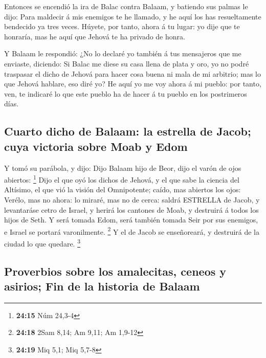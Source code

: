  Entonces se encendió la ira de Balac contra Balaam, y
batiendo sus palmas le dijo: Para maldecir á mis enemigos te he llamado,
y he aquí los has resueltamente bendecido ya tres veces. 
Húyete, por tanto, ahora á tu lugar: yo dije que te honraría, mas he
aquí que Jehová te ha privado de honra.

 Y Balaam le respondió: ¿No lo declaré yo también á tus
mensajeros que me enviaste, diciendo:  Si Balac me diese su
casa llena de plata y oro, yo no podré traspasar el dicho de Jehová para
hacer cosa buena ni mala de mi arbitrio; mas lo que Jehová hablare, eso
diré yo?  He aquí yo me voy ahora á mi pueblo: por tanto,
ven, te indicaré lo que este pueblo ha de hacer á tu pueblo en los
postrimeros días.

\hypertarget{cuarto-dicho-de-balaam-la-estrella-de-jacob-cuya-victoria-sobre-moab-y-edom}{%
\subsection{Cuarto dicho de Balaam: la estrella de Jacob; cuya victoria
sobre Moab y
Edom}\label{cuarto-dicho-de-balaam-la-estrella-de-jacob-cuya-victoria-sobre-moab-y-edom}}

 Y tomó su parábola, y dijo: Dijo Balaam hijo de Beor, dijo
el varón de ojos abiertos: \footnote{\textbf{24:15} Núm 24,3-4}
 Dijo el que oyó los dichos de Jehová, y el que sabe la
ciencia del Altísimo, el que vió la visión del Omnipotente; caído, mas
abiertos los ojos:  Verélo, mas no ahora: lo miraré, mas no
de cerca: saldrá ESTRELLA de Jacob, y levantaráse cetro de Israel, y
herirá los cantones de Moab, y destruirá á todos los hijos de Seth.
 Y será tomada Edom, será también tomada Seir por sus
enemigos, e Israel se portará varonilmente. \footnote{\textbf{24:18}
  2Sam 8,14; Am 9,11; Am 1,9-12}  Y el de Jacob se
enseñoreará, y destruirá de la ciudad lo que quedare. \footnote{\textbf{24:19}
  Miq 5,1; Miq 5,7-8}

\hypertarget{proverbios-sobre-los-amalecitas-ceneos-y-asirios-fin-de-la-historia-de-balaam}{%
\subsection{Proverbios sobre los amalecitas, ceneos y asirios; Fin de la
historia de
Balaam}\label{proverbios-sobre-los-amalecitas-ceneos-y-asirios-fin-de-la-historia-de-balaam}}

